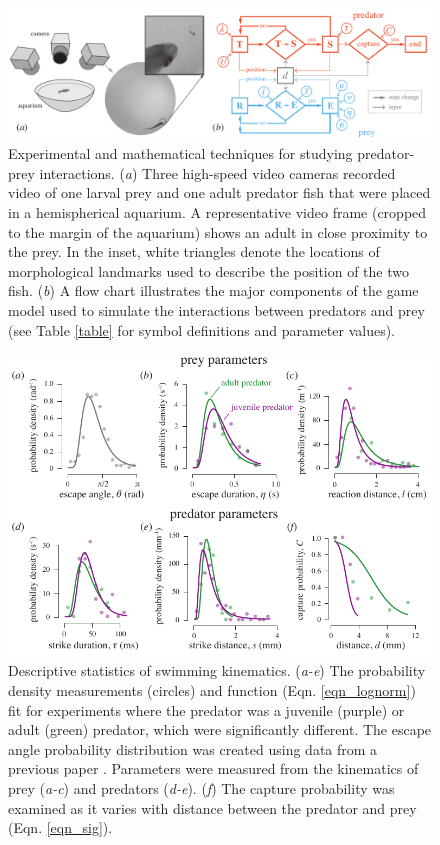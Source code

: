 \documentclass[]{rsos}%
\begin{document}
\pagebreak

\linespread{1}\selectfont %


\begin{figure}[!h]
\centering
	\includegraphics[width=5.5in]{fig_setup}
\caption{Experimental and mathematical techniques for studying predator-prey interactions. 
(\textit{a}) Three high-speed video cameras recorded video of one larval prey and one adult predator fish that were placed in a hemispherical aquarium. 
A representative video frame (cropped to the margin of the aquarium) shows an adult in close proximity to the prey. 
In the inset, white triangles denote the locations of morphological landmarks used to describe the position of the two fish.
 (\textit{b}) A flow chart illustrates the major components of the game model used to simulate the interactions between predators and prey (see Table \ref{table} for symbol definitions and parameter values).}
\label{fig_setup}
\end{figure}

\pagebreak

\begin{figure}[!h]
\centering
	\includegraphics[width=5.5in]{fig_PDFs}
\caption{Descriptive statistics of swimming kinematics. 
(\textit{a-e}) The probability density measurements (circles) and function (Eqn. \ref{eqn_lognorm}) fit for experiments where the predator was a juvenile (purple) or adult (green) predator, which were significantly different. The escape angle probability distribution was created using data from a previous paper \cite{Stewart:2014cma}. 
Parameters were measured from the kinematics of prey (\textit{a-c}) and predators (\textit{d-e}).
(\textit{f}) The capture probability was examined as it varies with distance between the predator and prey (Eqn. \ref{eqn_sig}).  
}
\label{fig_PDF}
\end{figure}
\end{document}
